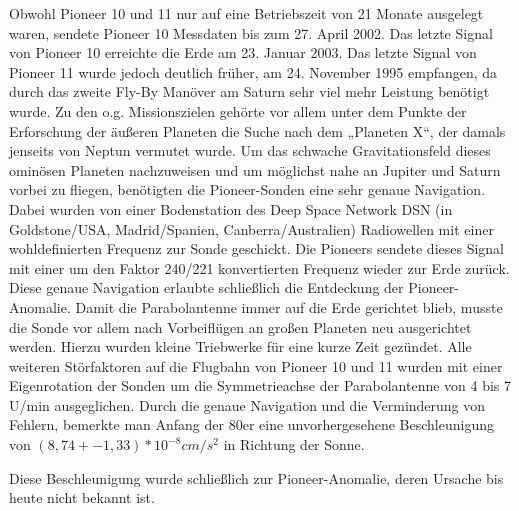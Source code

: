 Obwohl Pioneer 10 und 11 nur auf eine Betriebszeit von 21 Monate
ausgelegt waren, sendete Pioneer 10 Messdaten bis zum 27. April 2002.
Das letzte Signal von Pioneer 10 erreichte die Erde am 23. Januar 2003.
Das letzte Signal von Pioneer 11 wurde jedoch deutlich früher, am 24.
November 1995 empfangen, da durch das zweite Fly-By Manöver am Saturn
sehr viel mehr Leistung benötigt wurde.
Zu den o.g. Missionszielen gehörte vor allem unter dem Punkte der
Erforschung der äußeren Planeten die Suche nach dem „Planeten X“, der
damals jenseits von Neptun vermutet wurde. Um das schwache
Gravitationsfeld dieses ominösen Planeten nachzuweisen und um möglichst
nahe an Jupiter und Saturn vorbei zu fliegen, benötigten die
Pioneer-Sonden eine sehr genaue Navigation. Dabei wurden von einer
Bodenstation des Deep Space Network DSN (in Goldstone/USA,
Madrid/Spanien, Canberra/Australien) Radiowellen mit einer
wohldefinierten Frequenz zur Sonde geschickt. Die Pioneers sendete
dieses Signal mit einer um den Faktor 240/221 konvertierten Frequenz
wieder zur Erde zurück\cite{Dittus2006}. Diese genaue
Navigation erlaubte schließlich die Entdeckung der Pioneer-Anomalie. 
Damit die Parabolantenne immer auf die Erde gerichtet blieb, musste
die Sonde vor allem nach Vorbeiflügen an großen Planeten neu
ausgerichtet werden. Hierzu wurden kleine Triebwerke für eine kurze
Zeit gezündet. Alle weiteren Störfaktoren auf die Flugbahn von Pioneer
10 und 11 wurden mit einer Eigenrotation der Sonden um die
Symmetrieachse der Parabolantenne von 4 bis 7 U/min
ausgeglichen\cite{Dittus2006}\cite{Nieto2007}.
Durch die genaue Navigation und die Verminderung von Fehlern,
bemerkte man Anfang der 80er eine unvorhergesehene Beschleunigung von
$(8,74+-1,33)*10^{-8} cm/s^{2}$ \cite{Anderson2002} in Richtung der Sonne. 

Diese Beschleunigung wurde schließlich zur Pioneer-Anomalie, deren
Ursache bis heute nicht bekannt ist.
